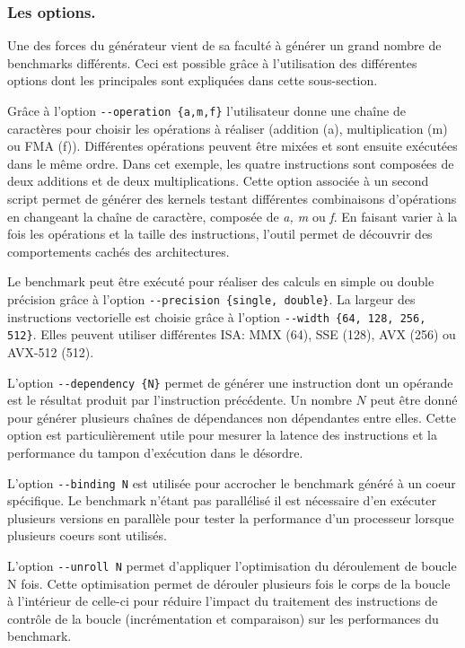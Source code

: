   
        \subsubsection{Les options.} 
        
            Une des forces du générateur vient de sa faculté à générer un grand nombre de benchmarks différents. Ceci est possible grâce à l'utilisation des différentes options dont les principales sont expliquées dans cette sous-section.
        
            Grâce à l'option \verb|--operation {a,m,f}| l'utilisateur donne une chaîne de caractères pour choisir  les opérations à réaliser (addition (a), multiplication (m) ou FMA (f)). Différentes opérations peuvent être mixées et sont ensuite exécutées dans le même ordre. Dans cet exemple, les quatre instructions sont composées de deux additions et de deux multiplications. Cette option associée à un second script permet de générer des kernels testant différentes combinaisons d'opérations en changeant la chaîne de caractère, composée de \textit{a, m} ou \textit{f}. En faisant varier à la fois les opérations et la taille des instructions, l'outil permet de découvrir des comportements cachés des architectures.
    
            Le benchmark peut être exécuté pour réaliser des calculs en simple ou double précision grâce à l'option \verb|--precision {single, double}|. 
            La largeur des instructions vectorielle est choisie grâce à l'option \verb|--width {64, 128, 256, 512}|. Elles peuvent utiliser différentes ISA: MMX (64), SSE (128), AVX (256) ou AVX-512 (512). 
            
            L'option \verb|--dependency {N}| permet de générer une instruction  dont un opérande est le résultat produit par l'instruction précédente. Un nombre $N$ peut être donné pour générer plusieurs chaînes de dépendances non dépendantes entre elles. Cette option est particulièrement utile pour mesurer la latence des instructions et la performance du tampon d'exécution dans le désordre.
            
            L'option \verb|--binding N| est utilisée pour accrocher le benchmark généré à un coeur spécifique. Le benchmark n'étant pas parallélisé il est nécessaire d'en exécuter plusieurs versions en parallèle pour tester la performance d'un processeur lorsque plusieurs coeurs sont utilisés.
            
            L'option \verb|--unroll N| permet d'appliquer l'optimisation du déroulement de boucle N fois. Cette optimisation permet de dérouler plusieurs fois le corps de la boucle à l'intérieur de celle-ci pour réduire l'impact du traitement des instructions de contrôle de la boucle (incrémentation et comparaison) sur les performances du benchmark. 
            
